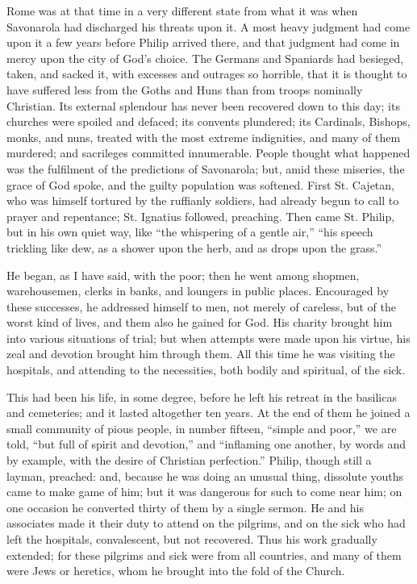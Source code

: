 Rome was at that time in a very different state from
what it was when Savonarola had discharged his threats
upon it. A most heavy judgment had come upon it a few
years before Philip arrived there, and that judgment had
come in mercy upon the city of God's choice. The Germans
and Spaniards had besieged, taken, and sacked it, with
excesses and outrages so horrible, that it is thought to
have suffered less from the Goths and Huns than from
troops nominally Christian. Its external splendour has
never been recovered down to this day; its churches were
spoiled and defaced; its convents plundered; its
Cardinals, Bishops, monks, and nuns, treated with the
most extreme indignities, and many of them murdered; and
sacrileges committed innumerable. People thought what
happened was the fulfilment of the predictions of
Savonarola; but, amid these miseries, the grace of God
spoke, and the guilty population was softened. First St.
Cajetan, who was himself tortured by the ruffianly
soldiers, had already begun to call to prayer and
repentance; St. Ignatius followed, preaching. Then came
St. Philip, but in his own quiet way, like ``the
whispering of a gentle air,'' ``his speech
trickling like dew, as a shower upon the herb, and as
drops upon the grass.''

He began, as I have said, with the poor; then he went
among shopmen, warehousemen, clerks in banks, and
loungers in public places. Encouraged by these successes,
he addressed himself to men, not merely of careless, but
of the worst kind of lives, and them also he gained for
God. His charity brought him into various situations of
trial; but when attempts were made upon his virtue, his
zeal and devotion brought him through them. All this time
he was visiting the hospitals, and attending to the
necessities, both bodily and spiritual, of the sick.

This had been his life, in some degree, before he left
his retreat in the basilicas and cemeteries; and it
lasted altogether ten years. At the end of them he joined
a small community of pious people, in number fifteen,
``simple and poor,'' we are told, ``but full
of spirit and devotion,'' and ``inflaming one
another, by words and by example, with the desire of
Christian perfection.'' Philip, though still a
layman, preached: and, because he was doing an unusual
thing, dissolute youths came to make game of him; but it
was dangerous for such to come near him; on one occasion
he converted thirty of them by a single sermon. He and
his associates made it their duty to attend on the
pilgrims, and on the sick who had left the hospitals,
convalescent, but not recovered. Thus his work gradually
extended; for these pilgrims and sick were from all
countries, and many of them were Jews or heretics, whom
he brought into the fold of the Church.

